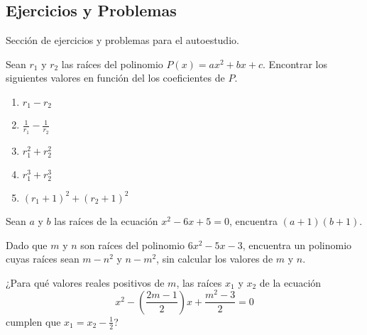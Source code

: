 \subsection{Ejercicios y Problemas}

Sección de ejercicios y problemas para el autoestudio.

\begin{section-exercise}
    Sean $r_1$ y $r_2$ las raíces del polinomio $P(x) = ax^2 + bx + c$.
    Encontrar los siguientes valores en función del los coeficientes de $P.$
    \begin{multicols}{3}
        \begin{enumerate}
            \item $r_1 - r_2$
            \item $\frac{1}{r_1} - \frac{1}{r_2}$
            \item $r^2_1 + r^2_2$
            \item $r^3_1 + r^3_2$
            \item $(r_1 + 1)^2 + (r_2 + 1)^2$
        \end{enumerate}
    \end{multicols}
\end{section-exercise}

\begin{section-problem}
    Sean $a$ y $b$ las raíces de la ecuación $x^2 - 6x + 5 = 0$, encuentra $(a + 1)(b + 1).$
\end{section-problem}

\begin{section-problem}
    Dado que $m$ y $n$ son raíces del polinomio $6x^2 - 5x - 3$, encuentra un polinomio cuyas raíces sean
    $m - n^2$ y $n - m^2$, sin calcular los valores de $m$ y $n$.
\end{section-problem}

\begin{section-problem}
    ¿Para qué valores reales positivos de $m$, las raíces $x_1$ y $x_2$ de la ecuación
    \[
        x^2 - \left( \frac{2m - 1}{2} \right)x  + \frac{m^2 - 3}{2} = 0
    \]
    cumplen que $x_1 = x_2 - \frac{1}{2}$?
\end{section-problem}
